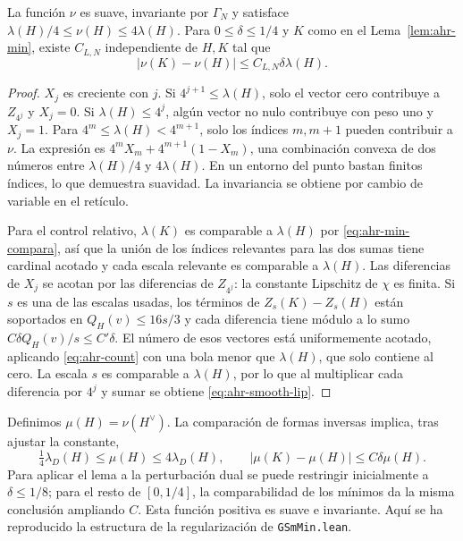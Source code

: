 \begin{lema}
\label{lem:ahr-smooth}
La función $\nu$ es suave, invariante por $\Gamma_N$ y satisface $\lambda(H)/4\le\nu(H)\le4\lambda(H)$. Para $0\le\delta\le1/4$ y $K$ como en el Lema~\ref{lem:ahr-min}, existe $C_{L,N}$ independiente de $H,K$ tal que
\begin{equation}
 |\nu(K)-\nu(H)|\le C_{L,N}\delta\lambda(H).
 \label{eq:ahr-smooth-lip}
\end{equation}
\end{lema}
\begin{proof}
$X_j$ es creciente con $j$. Si $4^{j+1}\le\lambda(H)$, solo el vector cero contribuye a $Z_{4^j}$ y $X_j=0$. Si $\lambda(H)\le4^j$, algún vector no nulo contribuye con peso uno y $X_j=1$. Para $4^m\le\lambda(H)<4^{m+1}$, solo los índices $m,m+1$ pueden contribuir a $\nu$. La expresión es $4^mX_m+4^{m+1}(1-X_m)$, una combinación convexa de dos números entre $\lambda(H)/4$ y $4\lambda(H)$. En un entorno del punto bastan finitos índices, lo que demuestra suavidad. La invariancia se obtiene por cambio de variable en el retículo.

Para el control relativo, $\lambda(K)$ es comparable a $\lambda(H)$ por \eqref{eq:ahr-min-compara}, así que la unión de los índices relevantes para las dos sumas tiene cardinal acotado y cada escala relevante es comparable a $\lambda(H)$. Las diferencias de $X_j$ se acotan por las diferencias de $Z_{4^j}$: la constante Lipschitz de $\chi$ es finita. Si $s$ es una de las escalas usadas, los términos de $Z_s(K)-Z_s(H)$ están soportados en $Q_H(v)\le 16s/3$ y cada diferencia tiene módulo a lo sumo $C\delta Q_H(v)/s\le C'\delta$. El número de esos vectores está uniformemente acotado, aplicando \eqref{eq:ahr-count} con una bola menor que $\lambda(H)$, que solo contiene al cero. La escala $s$ es comparable a $\lambda(H)$, por lo que al multiplicar cada diferencia por $4^j$ y sumar se obtiene \eqref{eq:ahr-smooth-lip}.
\end{proof}

Definimos $\mu(H)=\nu(H^\vee)$. La comparación de formas inversas implica, tras ajustar la constante,
\begin{equation}
 \tfrac14\lambda_D(H)\le\mu(H)\le4\lambda_D(H),\qquad
 |\mu(K)-\mu(H)|\le C\delta\mu(H).
 \label{eq:ahr-mu}
\end{equation}
Para aplicar el lema a la perturbación dual se puede restringir inicialmente a $\delta\le1/8$; para el resto de $[0,1/4]$, la comparabilidad de los mínimos da la misma conclusión ampliando $C$. Esta función positiva es suave e invariante. Aquí se ha reproducido la estructura de la regularización de \texttt{GSmMin.lean}.

